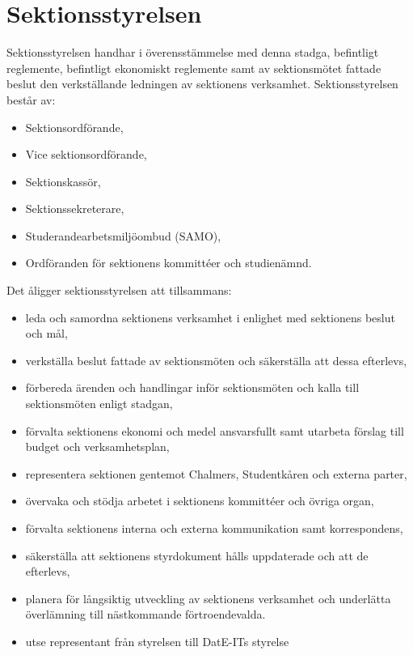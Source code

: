 \documentclass[a4paper]{dtek}
\begin{document}
\section{Sektionsstyrelsen}
 Sektionsstyrelsen handhar i överensstämmelse med denna stadga, befintligt reglemente, befintligt ekonomiskt reglemente samt av sektionsmötet fattade beslut den verkställande ledningen av sektionens verksamhet.
\para Sektionsstyrelsen består av:
\begin{itemize}\setlength\itemsep{0em}
\item Sektionsordförande,
\item Vice sektionsordförande,
\item Sektionskassör,
\item Sektionssekreterare,
\item Studerandearbetsmiljöombud (SAMO),
\item Ordföranden för sektionens kommittéer och studienämnd.
\end{itemize}
\para[Åligganden] Det åligger sektionsstyrelsen att tillsammans:
\begin{itemize}\setlength\itemsep{0em}
\item leda och samordna sektionens verksamhet i enlighet med sektionens beslut och mål,
\item verkställa beslut fattade av sektionsmöten och säkerställa att dessa efterlevs,
\item förbereda ärenden och handlingar inför sektionsmöten och kalla till sektionsmöten enligt stadgan,
\item förvalta sektionens ekonomi och medel ansvarsfullt samt utarbeta förslag till budget och verksamhetsplan,
\item representera sektionen gentemot Chalmers, Studentkåren och externa parter,
\item övervaka och stödja arbetet i sektionens kommittéer och övriga organ, 
\item förvalta sektionens interna och externa kommunikation samt korrespondens, 
\item säkerställa att sektionens styrdokument hålls uppdaterade och att de efterlevs,
\item planera för långsiktig utveckling av sektionens verksamhet och underlätta överlämning till nästkommande förtroendevalda.
\item utse representant från styrelsen till DatE-ITs styrelse
\end{itemize}
\end{document}
